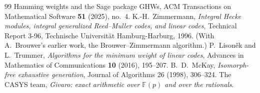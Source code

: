 \documentclass[11pt,reqno]{amsart}
\theoremstyle{plain}
\theoremstyle{definition}
\theoremstyle{remark}
\newcommand{\GF}{\mathbb{F}}
\begin{document}
\begin{thebibliography}{99}
{  Hamming weights and the Sage package GHWs}, ACM Transactions on Mathematical
  Software \textbf{51} (2025), no.~4.
 K.-H.~Zimmermann, \emph{Integral Hecke modules, integral
  generalized Reed--Muller codes, and linear codes}, Technical Report 3-96,
  Technische Universit\"at Hamburg-Harburg, 1996. (With A.~Brouwer's earlier
  work, the Brouwer--Zimmermann algorithm.)
 P.~Lison\v{e}k and L.~Trummer, \emph{Algorithms for the
  minimum weight of linear codes}, Advances in Mathematics of Communications
  \textbf{10} (2016), 195--207.
 B.~D.~McKay, \emph{Isomorph-free exhaustive generation},
  Journal of Algorithms 26 (1998), 306--324.
 The CASYS team, \emph{Givaro: exact arithmetic over
  $\GF(p)$ and over the rationals}.
\end{thebibliography}
\end{document}
